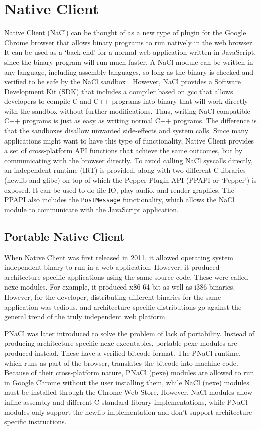 \section{Native Client} %
\label{sec:native_client_intro}

Native Client (NaCl) can be thought of as a new type of plugin for the Google Chrome browser that allows binary programs to run natively in the web browser. It can be used as a `back end' for a normal web application written in JavaScript, since the binary program will run much faster. A NaCl module can be written in any language, including assembly languages, so long as the binary is checked and verified to be safe by the NaCl sandbox \cite{nacl}. However, NaCl provides a Software Development Kit (SDK) that includes a compiler based on gcc that allows developers to compile C and C++ programs into binary that will work directly with the sandbox without further modifications. Thus, writing NaCl-compatible C++ programs is just as easy as writing normal C++ programs. The difference is that the sandboxes disallow unwanted side-effects and system calls. Since many applications might want to have this type of functionality, Native Client provides a set of cross-platform API functions that achieve the same outcomes, but by communicating with the browser directly. To avoid calling NaCl syscalls directly, an independent runtime (IRT) is provided, along with two different C libraries (newlib and glibc) on top of which the Pepper Plugin API (PPAPI or `Pepper') is exposed. It can be used to do file IO, play audio, and render graphics. The PPAPI also includes the \lstinline+PostMessage+ functionality, which allows the NaCl module to communicate with the JavaScript application.

\subsection{Portable Native Client} %
\label{sub:portable_native_client}
When Native Client was first released in 2011, it allowed operating system independent binary to run in a web application. However, it produced architecture-specific applications using the same source code. These were called nexe modules. For example, it produced x86 64 bit as well as i386 binaries. However, for the developer, distributing different binaries for the same application was tedious, and architecture specific distributions go against the general trend of the truly independent web platform.

PNaCl was later introduced to solve the problem of lack of portability. Instead of producing architecture specific nexe executables, portable pexe modules are produced instead. These have a verified bitcode format. The PNaCl runtime, which runs as part of the browser, translates the bitcode into machine code. Because of their cross-platform nature, PNaCl (pexe) modules are allowed to run in Google Chrome without the user installing them, while NaCl (nexe) modules must be installed through the Chrome Web Store. However, NaCl modules allow inline assembly and different C standard library implementations, while PNaCl modules only support the newlib implementation and don't support architecture specific instructions.

